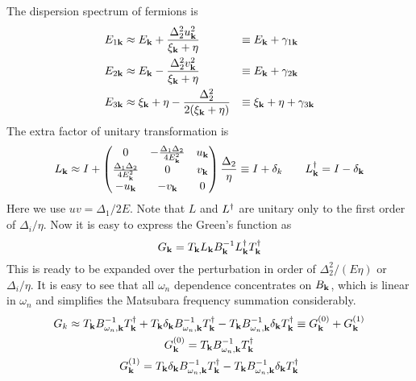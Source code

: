 The dispersion spectrum of fermions is
\begin{align}\label{eq:pathInt2:xiExpand}
E_{1\mathbf{k}}&\approx{}E_{\mathbf{k}}+\frac{\Delta_{2}^{2}u_{\mathbf{k}}^{2}}{\xi_{\mathbf{k}}+\eta}&\equiv{}&E_{\mathbf{k}}+\gamma_{1\mathbf{k}}\\
E_{2\mathbf{k}}&\approx{}E_{\mathbf{k}}-\frac{\Delta_{2}^{2}v_{\mathbf{k}}^{2}}{\xi_{\mathbf{k}}+\eta}&\equiv{}&E_{\mathbf{k}}+\gamma_{2\mathbf{k}}
\label{eq:pathInt2:xiExpand2}\\
E_{3\mathbf{k}}&\approx{}\xi_{\mathbf{k}}+\eta-\frac{\Delta_{2}^{2}}{2(\xi_{\mathbf{k}}+\eta)}&\equiv{}&\xi_{\mathbf{k}}+\eta+\gamma_{3\mathbf{k}}
\label{eq:pathInt2:xiExpand3}
\end{align}
The extra factor of unitary transformation is 
\begin{equation}\label{eq:pathInt2:L1}
L_{\mathbf{k}}\approx{}I+
\begin{pmatrix}0&-\frac{\Delta_{1}{}\Delta_{2}{}}{4E^{2}_{\mathbf{k}}}&u_{\mathbf{k}}\\
\frac{\Delta_{1}{}\Delta_{2}{}}{4E^{2}_{\mathbf{k}}}&0&v_{\mathbf{k}}\\
-u_{\mathbf{k}}&-v_{\mathbf{k}}&0
\end{pmatrix}\frac{\Delta_{2}{}}{\eta}
\equiv{}I+\delta_{k}\qquad
L^{\dagger}_{\mathbf{k}}=I-\delta_{\mathbf{k}}
\end{equation}
Here we use $uv=\Delta_{1}/2E$.    Note that $L$ and $L^{\dagger}$ are unitary only to the first order of $\Delta_{i}/\eta$.
Now it is easy to express the Green's function as
\begin{equation}
G_{\mathbf{k}}=T_{\mathbf{k}}L_{\mathbf{k}}B_{\mathbf{k}}^{-1}L_{\mathbf{k}}^{\dagger}T_{\mathbf{k}}^{\dagger}
\end{equation}
This is ready to be expanded over the perturbation in order of  $\Delta_{2}^{2}/(E\eta)$ or $\Delta_{i}/\eta$.  It is easy to see that all $\omega_{n}$ dependence concentrates on $B_{\mathbf{k}}$, which is linear in $\omega_{n}$  and simplifies the Matsubara frequency summation considerably.   
\begin{subequations}\label{eq:pathInt2:Gexpand}
\begin{gather}
G_{k}\approx{}T_{\mathbf{k}}B_{\omega_{n},\mathbf{k}}^{-1}T_{\mathbf{k}}^{\dagger}+T_{\mathbf{k}}\delta_{\mathbf{k}}B_{\omega_{n},\mathbf{k}}^{-1}T_{\mathbf{k}}^{\dagger}
	-T_{\mathbf{k}}B_{\omega_{n},\mathbf{k}}^{-1}\delta_{\mathbf{k}}T_{\mathbf{k}}^{\dagger}
	\equiv{}G_{\mathbf{k}}^{(0)}+G_{\mathbf{k}}^{(1)}\\
	G_{\mathbf{k}}^{(0)}=T_{\mathbf{k}}B_{\omega_{n},\mathbf{k}}^{-1}T_{\mathbf{k}}^{\dagger}\\
	G_{\mathbf{k}}^{(1)}=T_{\mathbf{k}}\delta_{\mathbf{k}}B_{\omega_{n},\mathbf{k}}^{-1}T_{\mathbf{k}}^{\dagger}
	-T_{\mathbf{k}}B_{\omega_{n},\mathbf{k}}^{-1}\delta_{\mathbf{k}}T_{\mathbf{k}}^{\dagger}
\end{gather}
\end{subequations}

